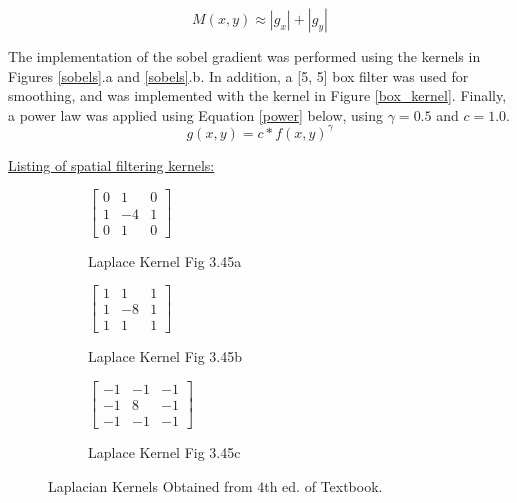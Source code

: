 \documentclass[./rarnold_report3.tex]{subfiles}
\begin{document}
\begin{equation}
\label{gradient}
M(x,y) \approx |g_x| + |g_y|
\end{equation}

\noindent The implementation of the sobel gradient was performed using the kernels in Figures \ref{sobels}.a and \ref{sobels}.b.  In addition, a [5, 5] box filter was used for smoothing, and was implemented with the kernel in Figure \ref{box_kernel}.  Finally, a power law was applied using Equation \eqref{power} below, using $\gamma = 0.5$ and $c=1.0$.
\begin{equation}
\label{power}
g(x,y) = c*f(x,y)^{\gamma}
\end{equation}

\begin{center}\underline{Listing of spatial filtering kernels:}\end{center}

\begin{figure}[!htbp]	
	\centering
	\begin{subfigure}{0.33\textwidth}
	\centering
	$\begin{bmatrix}
	0 & 1 & 0 \\
	1 & -4 & 1 \\
	0 & 1 & 0
	\end{bmatrix}$
	\caption{Laplace Kernel Fig 3.45a}
	\end{subfigure}%
	\begin{subfigure}{0.33\textwidth}
	\centering
	$\begin{bmatrix}
	1 & 1 & 1 \\
	1 & -8 & 1 \\
	1 & 1 & 1
	\end{bmatrix}$
	\caption{Laplace Kernel Fig 3.45b}
	\end{subfigure}%
	\begin{subfigure}{0.33\textwidth}
	\centering
	$\begin{bmatrix}
	-1 & -1 & -1 \\
	-1 & 8 & -1 \\
	-1 & -1 & -1
	\end{bmatrix}$
	\caption{Laplace Kernel Fig 3.45c}
	\end{subfigure}	
	\caption{Laplacian Kernels Obtained from 4th ed. of Textbook.}
	\label{lap kernels}
\end{figure}
\end{document}
